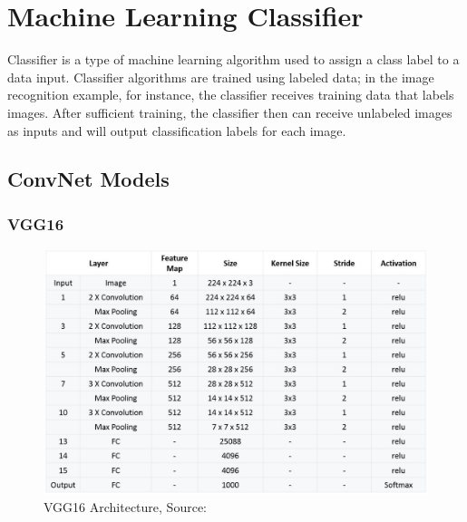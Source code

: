 \section{Machine Learning Classifier}
Classifier is a type of machine learning algorithm used to assign a class label to a data input. Classifier algorithms are trained using labeled data; in the image recognition example, for instance, the classifier receives training data that labels images. After sufficient training, the classifier then can receive unlabeled images as inputs and will output classification labels for each image.\par \vspace{1em}


    \subsection{ConvNet Models}
        
        \subsubsection{VGG16}
        \begin{figure}
            \centering
            \includegraphics[width=1\linewidth]{graphics//chapter3/vgg16 arch.png}
            \caption{VGG16 Architecture, Source: \cite{WEBSITE:vgg16-arch-diagram}}
            \label{fig:vgg16-arch}
        \end{figure}
        
